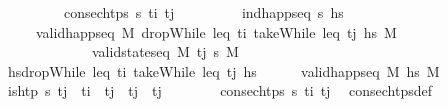\begin{isabellebody}
\ \ \ \ \ \ \ \ \ {\isachardoublequoteopen}consec{\isacharunderscore}{\kern0pt}htps\ {\isasympi}s\ t\isactrlsub i\ t\isactrlsub j{\isachardoublequoteclose}\isanewline
\ \ \ \ \ \ \ \ \ {\isachardoublequoteopen}ind{\isacharunderscore}{\kern0pt}happ{\isacharunderscore}{\kern0pt}seq\ {\isasympi}s\ hs{\isachardoublequoteclose}\isanewline
\ \ \ \ \ {\isachardoublequoteopen}valid{\isacharunderscore}{\kern0pt}happ{\isacharunderscore}{\kern0pt}seq\ M\ {\isacharparenleft}{\kern0pt}dropWhile\ {\isacharparenleft}{\kern0pt}leq\ t\isactrlsub i{\isacharparenright}{\kern0pt}\ {\isacharparenleft}{\kern0pt}takeWhile\ {\isacharparenleft}{\kern0pt}leq\ t\isactrlsub j{\isacharparenright}{\kern0pt}\ hs{\isacharparenright}{\kern0pt}{\isacharparenright}{\kern0pt}\ M{\isacharprime}{\kern0pt}\ \isanewline
\ \ \ \ \ \ \ \ \ \ \ \ {\isasymlongleftrightarrow}\ valid{\isacharunderscore}{\kern0pt}state{\isacharunderscore}{\kern0pt}seq\ M\ {\isacharbrackleft}{\kern0pt}t\isactrlsub j{\isacharbrackright}{\kern0pt}\ {\isasympi}s\ M{\isacharprime}{\kern0pt}{\isachardoublequoteclose}\isanewline
%
\isadelimproof
\ \ %
\endisadelimproof
%
\isatagproof
{}\isamarkupfalse%
\isanewline
\ \ \ \ \isamarkupfalse%
\ {\isacharquery}{\kern0pt}hs{\isacharprime}{\kern0pt}{\isacharequal}{\kern0pt}{\isachardoublequoteopen}dropWhile\ {\isacharparenleft}{\kern0pt}leq\ t\isactrlsub i{\isacharparenright}{\kern0pt}\ {\isacharparenleft}{\kern0pt}takeWhile\ {\isacharparenleft}{\kern0pt}leq\ t\isactrlsub j{\isacharparenright}{\kern0pt}\ hs{\isacharparenright}{\kern0pt}{\isachardoublequoteclose}\isanewline
\ \ \ \ \isamarkupfalse%
\ {\isachardoublequoteopen}valid{\isacharunderscore}{\kern0pt}happ{\isacharunderscore}{\kern0pt}seq\ M\ {\isacharquery}{\kern0pt}hs{\isacharprime}{\kern0pt}\ M{\isacharprime}{\kern0pt}{\isachardoublequoteclose}\isanewline
\isanewline
\ \ \ \ \isamarkupfalse%
\ {\isachardoublequoteopen}is{\isacharunderscore}{\kern0pt}htp\ {\isasympi}s\ t\isactrlsub j{\isachardoublequoteclose}\ \ {\isachardoublequoteopen}t\isactrlsub i\ {\isacharless}{\kern0pt}\ t\isactrlsub j{\isachardoublequoteclose}\ \ {\isachardoublequoteopen}t\isactrlsub j\ {\isasymle}\ t\isactrlsub j{\isachardoublequoteclose}\isanewline
\ \ \ \ \ \ \isamarkupfalse%
\ {\isacartoucheopen}consec{\isacharunderscore}{\kern0pt}htps\ {\isasympi}s\ t\isactrlsub i\ t\isactrlsub j{\isacartoucheclose}\ \isamarkupfalse%
\ consec{\isacharunderscore}{\kern0pt}htps{\isacharunderscore}{\kern0pt}def\ \isamarkupfalse%

\end{isabellebody}
